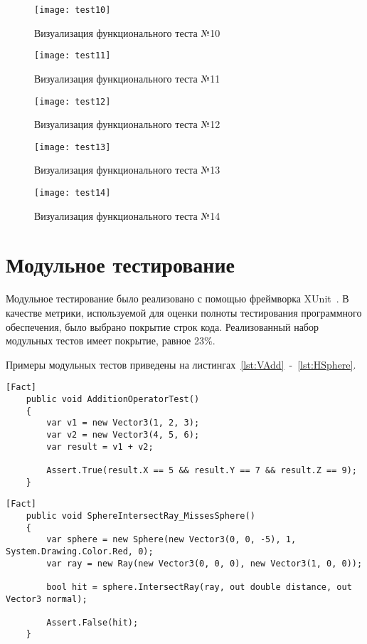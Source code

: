 \begin{figure}[H]
	\centering
	\texttt{[image: test10]}
	\caption{Визуализация функционального теста №10}
	\label{fig:test10}
\end{figure}
\begin{figure}[H]
	\centering
	\texttt{[image: test11]}
	\caption{Визуализация функционального теста №11}
	\label{fig:test11}
\end{figure}
\begin{figure}[H]
	\centering
	\texttt{[image: test12]}
	\caption{Визуализация функционального теста №12}
	\label{fig:test12}
\end{figure}
\begin{figure}[H]
	\centering
	\texttt{[image: test13]}
	\caption{Визуализация функционального теста №13}
	\label{fig:test13}
\end{figure}
\begin{figure}[H]
	\centering
	\texttt{[image: test14]}
	\caption{Визуализация функционального теста №14}
	\label{fig:test14}
\end{figure}

\section{Модульное тестирование}
Модульное тестирование было реализовано с помощью фреймворка XUnit~\cite{XUnit}. В качестве метрики, используемой для оценки полноты тестирования программного обеспечения, было выбрано покрытие строк кода. Реализованный набор модульных тестов имеет покрытие, равное 23\%.

Примеры модульных тестов приведены на листингах~\ref{lst:VAdd}~-~\ref{lst:HSphere}.
\clearpage
\begin{center}
	\begin{lstlisting}[linewidth=\linewidth, label={lst:VAdd}, captionpos={t}, caption={Пример модульного теста для сложения двух векторов}]
	[Fact]
	public void AdditionOperatorTest()
	{
		var v1 = new Vector3(1, 2, 3);
		var v2 = new Vector3(4, 5, 6);
		var result = v1 + v2;
		
		Assert.True(result.X == 5 && result.Y == 7 && result.Z == 9);
	}
	\end{lstlisting}
\end{center}

\begin{center}
	\begin{lstlisting}[linewidth=\linewidth, label={lst:HSphere}, captionpos={t}, caption={Пример модульного теста для неуспешного поиска пересечения луча со сферой}]
	[Fact]
	public void SphereIntersectRay_MissesSphere()
	{
		var sphere = new Sphere(new Vector3(0, 0, -5), 1, System.Drawing.Color.Red, 0);
		var ray = new Ray(new Vector3(0, 0, 0), new Vector3(1, 0, 0));
		
		bool hit = sphere.IntersectRay(ray, out double distance, out Vector3 normal);
		
		Assert.False(hit);
	}
	\end{lstlisting}
\end{center}


